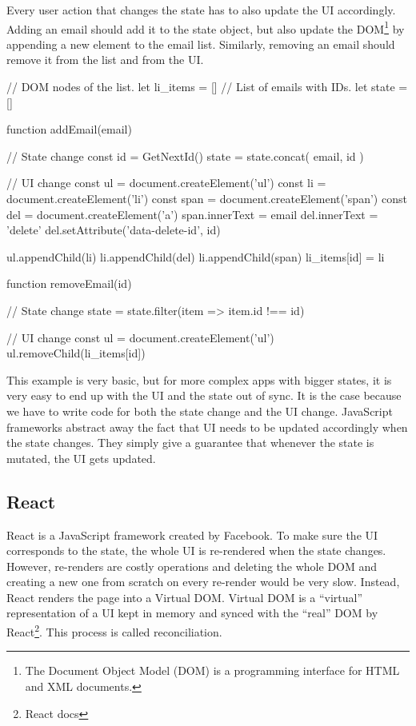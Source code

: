 Every user action that changes the state has to also update the UI accordingly. Adding an email should add it to the state object, but also update
the DOM\footnote{The Document Object Model (DOM) is a programming interface for HTML and XML documents.} by appending a new element to the email list.
Similarly, removing an email should remove it from the list and from the UI.
\begin{code}
// DOM nodes of the list.
let li_items = []
// List of emails with IDs.
let state = []

function addEmail(email) {
    // State change
    const id = GetNextId()
    state = state.concat({ email, id })

    // UI change
    const ul = document.createElement('ul')
    const li = document.createElement('li')
    const span = document.createElement('span')
    const del = document.createElement('a')
    span.innerText = email
    del.innerText = 'delete'
    del.setAttribute('data-delete-id', id)

    ul.appendChild(li)
    li.appendChild(del)
    li.appendChild(span)
    li_items[id] = li
}

function removeEmail(id) {
    // State change
    state = state.filter(item => item.id !== id)

    // UI change
    const ul = document.createElement('ul')
    ul.removeChild(li_items[id])
}
\end{code}

This example is very basic, but for more complex apps with bigger states, it is very easy to end up with the UI and the state out of sync. It is the case
because we have to write code for both the state change and the UI change. JavaScript frameworks abstract away the fact that UI needs
to be updated accordingly when the state changes. They simply give a guarantee that whenever the state is mutated, the UI gets updated.

\subsection{React}
React \cite{React} is a JavaScript framework created by Facebook. To make sure the UI corresponds to the state, the whole UI is re-rendered
when the state changes. However, re-renders are costly operations and deleting the whole DOM and creating a new one from scratch on every re-render
would be very slow. Instead, React renders the page into a Virtual DOM. Virtual DOM is a “virtual” representation of a UI kept in memory and
synced with the “real” DOM by React\footnote{React docs}. This process is called reconciliation.

